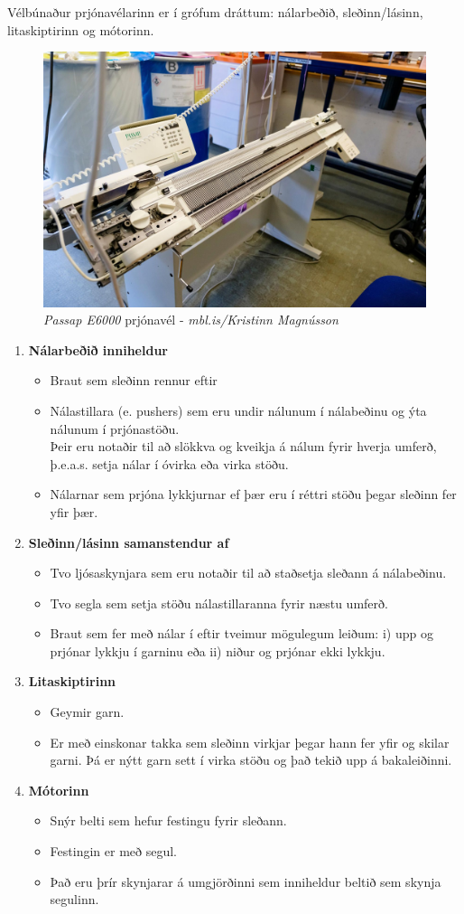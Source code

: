 Vélbúnaður prjónavélarinn er í grófum dráttum:  nálarbeðið, sleðinn/lásinn, litaskiptirinn og mótorinn.

\begin{figure}[H] %
    \centering
    \includegraphics[width=0.5\linewidth]{myndir/elli/e6000.jpg}
    \caption{\textit{Passap E6000} prjónavél - \textit{mbl.is/Kristinn Magnússon}}
    \label{fig:e6000}
\end{figure}
\begin{enumerate}
    \item \textbf{Nálarbeðið inniheldur}
\begin{itemize}
    \item Braut sem sleðinn rennur eftir
    \item Nálastillara (e. pushers) sem eru undir nálunum í nálabeðinu og ýta nálunum í prjónastöðu. \\
    Þeir eru notaðir til að slökkva og kveikja á nálum fyrir hverja umferð, þ.e.a.s. setja nálar í óvirka eða virka stöðu.
    \item Nálarnar sem prjóna lykkjurnar ef þær eru í réttri stöðu þegar sleðinn fer yfir þær.
\end{itemize}
    \item \textbf{Sleðinn/lásinn samanstendur af}
    \begin{itemize}
        \item Tvo ljósaskynjara sem eru notaðir til að staðsetja sleðann á nálabeðinu.
        \item Tvo segla sem setja stöðu nálastillaranna fyrir næstu umferð.
        \item Braut sem fer með nálar í eftir tveimur mögulegum leiðum: 
        i) upp og prjónar lykkju í garninu eða ii) niður og prjónar ekki lykkju.
    \end{itemize}
    \item \textbf{Litaskiptirinn}
    \begin{itemize}
        \item Geymir garn.
        \item Er með einskonar takka sem sleðinn virkjar þegar hann fer yfir og skilar garni. Þá er nýtt garn sett í virka stöðu og það tekið upp á bakaleiðinni.
    \end{itemize}
    \item \textbf{Mótorinn} 
    \begin{itemize}
        \item Snýr belti sem hefur festingu fyrir sleðann.
        \item Festingin er með segul.
        \item Það eru þrír skynjarar á umgjörðinni sem inniheldur beltið sem skynja segulinn.
    \end{itemize}
\end{enumerate}

